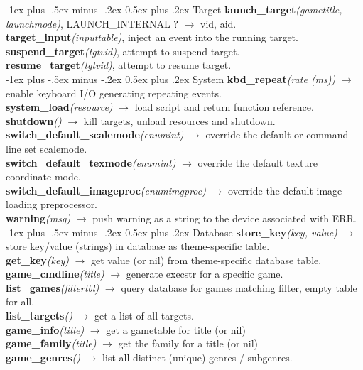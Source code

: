 \documentclass[10pt,landscape]{article}
\makeatletter
\renewcommand{\section}{\@startsection{section}{1}{0mm}%
                                {-1ex plus -.5ex minus -.2ex}%
                                {0.5ex plus .2ex}%
                                {\normalfont\large\bfseries}}
\makeatother
\begin{document}
\begin{multicols}{3}
\section{Target}
		\textbf{launch\_target}\emph{(gametitle, launchmode)}, LAUNCH\_INTERNAL ? $\rightarrow$ vid, aid.\\
		\textbf{target\_input}\emph{(inputtable)}, inject an event into the running target.\\
		\textbf{suspend\_target}\emph{(tgtvid)}, attempt to suspend target.\\
		\textbf{resume\_target}\emph{(tgtvid)}, attempt to resume target.\\

\section{System}
	\textbf{kbd\_repeat}\emph{(rate (ms))} $\rightarrow$ enable keyboard I/O generating repeating events.\\
	\textbf{system\_load}\emph{(resource)} $\rightarrow$ load script and return function reference.\\
	\textbf{shutdown}\emph{()} $\rightarrow$ kill targets, unload resources and shutdown.\\
	\textbf{switch\_default\_scalemode}\emph{(enumint)} $\rightarrow$ override the default or command-line set scalemode.\\
	\textbf{switch\_default\_texmode}\emph{(enumint)} $\rightarrow$ override the default texture coordinate mode.\\
	\textbf{switch\_default\_imageproc}\emph{(enumimgproc)} $\rightarrow$ override the default image-loading preprocessor.\\
	\textbf{warning}\emph{(msg)} $\rightarrow$ push warning as a string to the device associated with ERR.\\
	
\section{Database}
	\textbf{store\_key}\emph{(key, value)} $\rightarrow$ store key/value (strings) in database as theme-specific table.\\
	\textbf{get\_key}\emph{(key)} $\rightarrow$ get value (or nil) from theme-specific database table.\\
	\textbf{game\_cmdline}\emph{(title)} $\rightarrow$ generate execstr for a specific game.\\
	\textbf{list\_games}\emph{(filtertbl)} $\rightarrow$ query database for games matching filter, empty table for all.\\
	\textbf{list\_targets}\emph{()} $\rightarrow$ get a list of all targets.\\
	\textbf{game\_info}\emph{(title)} $\rightarrow$ get a gametable for title (or nil)\\
	\textbf{game\_family}\emph{(title)} $\rightarrow$ get the family for a title (or nil)\\
	\textbf{game\_genres}\emph{()} $\rightarrow$ list all distinct (unique) genres / subgenres.\\


\end{multicols}
\end{document}
